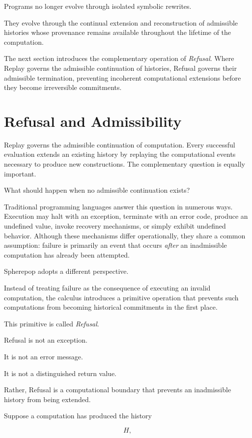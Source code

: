 \documentclass[12pt,oneside]{article}
\theoremstyle{definition}
\theoremstyle{remark}
\begin{document}
Programs no longer evolve through isolated symbolic rewrites.

They evolve through the continual extension and reconstruction of admissible
histories whose provenance remains available throughout the lifetime of the
computation.

The next section introduces the complementary operation of \emph{Refusal}.
Where Replay governs the admissible continuation of histories, Refusal
governs their admissible termination, preventing incoherent computational
extensions before they become irreversible commitments.

\section{Refusal and Admissibility}

Replay governs the admissible continuation of computation. Every successful
evaluation extends an existing history by replaying the computational events
necessary to produce new constructions. The complementary question is equally
important.

What should happen when no admissible continuation exists?

Traditional programming languages answer this question in numerous ways.
Execution may halt with an exception, terminate with an error code, produce an
undefined value, invoke recovery mechanisms, or simply exhibit undefined
behavior. Although these mechanisms differ operationally, they share a common
assumption: failure is primarily an event that occurs \emph{after} an
inadmissible computation has already been attempted.

Spherepop adopts a different perspective.

Instead of treating failure as the consequence of executing an invalid
computation, the calculus introduces a primitive operation that prevents such
computations from becoming historical commitments in the first place.

This primitive is called \emph{Refusal}.

Refusal is not an exception.

It is not an error message.

It is not a distinguished return value.

Rather, Refusal is a computational boundary that prevents an inadmissible
history from being extended.

Suppose a computation has produced the history

\[
H,
\]
\end{document}
